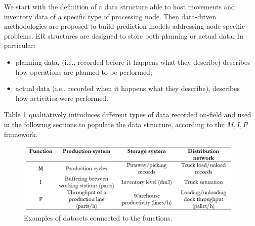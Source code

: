 We start with the definition of a data structure able to host movements and inventory data of a specific type of processing node. Then data-driven methodologies are proposed to build prediction models addressing node-specific problems. ER structures are designed to store both planning or actual data. In particular:

\begin{itemize}
    \item planning data, (i.e., recorded before it happens what they describe) describes how operations are planned to be performed;
    \item actual data (i.e., recorded when it happens what they describe), describes how activities were performed.
\end{itemize}

Table \ref{tab_MIPinLS} qualitatively introduces different types of data recorded on-field and used in the following sections to populate the data structure, according to the $M, I, P$ framework.

\begin{figure}[hbt!]
\centering
\includegraphics[width=1\textwidth]{SectionIntroduction/informationFramework_figures/tab_MIPinLS.png}
\captionsetup{type=table}
\caption{Examples of datasets connected to the functions.}
\label{tab_MIPinLS}
\end{figure}

\clearpage



